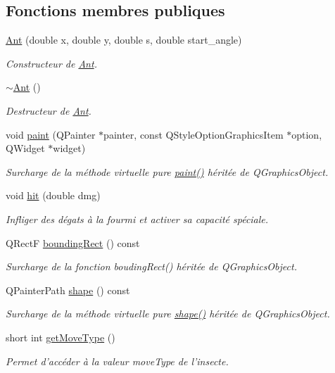 \subsection*{Fonctions membres publiques}
\begin{DoxyCompactItemize}
\item 
\hyperlink{classAnt_a52f0aed092463606f4d4edd2091d92eb}{Ant} (double x, double y, double s, double start\_\-angle)
\begin{DoxyCompactList}\small\item\em Constructeur de \hyperlink{classAnt}{Ant}. \end{DoxyCompactList}\item 
\hyperlink{classAnt_a33ca6bd592236726a18a2159908e4116}{$\sim$Ant} ()
\begin{DoxyCompactList}\small\item\em Destructeur de \hyperlink{classAnt}{Ant}. \end{DoxyCompactList}\item 
void \hyperlink{classAnt_abb2b56b817ce45d815251549a77402be}{paint} (QPainter $\ast$painter, const QStyleOptionGraphicsItem $\ast$option, QWidget $\ast$widget)
\begin{DoxyCompactList}\small\item\em Surcharge de la méthode virtuelle pure \hyperlink{classAnt_abb2b56b817ce45d815251549a77402be}{paint()} héritée de QGraphicsObject. \end{DoxyCompactList}\item 
void \hyperlink{classAnt_a64b0e0e7d2605c1a5a0906587ab70920}{hit} (double dmg)
\begin{DoxyCompactList}\small\item\em Infliger des dégats à la fourmi et activer sa capacité spéciale. \end{DoxyCompactList}\item 
QRectF \hyperlink{classBug_a9b39c25361faad07b1bf2dd927d09dab}{boundingRect} () const 
\begin{DoxyCompactList}\small\item\em Surcharge de la fonction boudingRect() héritée de QGraphicsObject. \end{DoxyCompactList}\item 
QPainterPath \hyperlink{classBug_a587a36d3145c2b4dba6c689af22c65ac}{shape} () const 
\begin{DoxyCompactList}\small\item\em Surcharge de la méthode virtuelle pure \hyperlink{classBug_a587a36d3145c2b4dba6c689af22c65ac}{shape()} héritée de QGraphicsObject. \end{DoxyCompactList}\item 
short int \hyperlink{classBug_aced471cedcfa855baddf4c827003e755}{getMoveType} ()
\begin{DoxyCompactList}\small\item\em Permet d'accéder à la valeur moveType de l'insecte. \end{DoxyCompactList}\end{DoxyCompactItemize}
